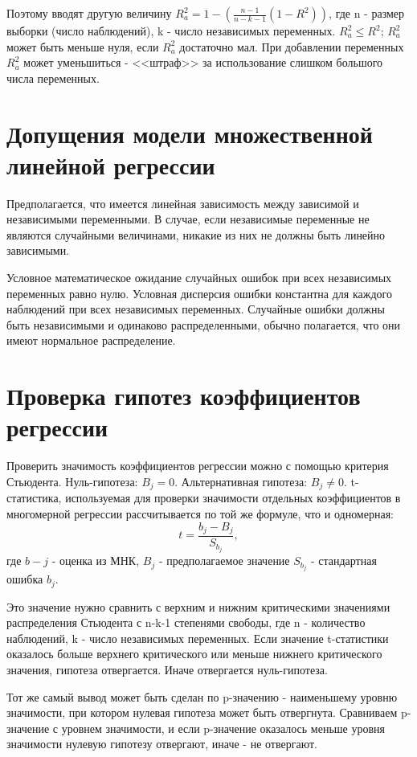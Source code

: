 Поэтому вводят другую величину $R_a^2 = 1 - (\frac{n-1}{n-k-1}(1-R^2))$, где n - размер выборки (число наблюдений), k - число независимых переменных. $R_a^2 \leq R^2$; $R_a^2$ может быть меньше нуля, если $R_a^2$ достаточно мал. При добавлении переменных $R_a^2$ может уменьшиться - <<штраф>> за использование слишком большого числа переменных.
\section{Допущения модели множественной линейной регрессии}
\hspace*{\parindent}
Предполагается, что имеется линейная зависимость между зависимой и независимыми переменными. В случае, если независимые переменные не являются случайными величинами, никакие из них не должны быть линейно зависимыми. 

Условное математическое ожидание случайных ошибок при всех независимых переменных равно нулю. Условная дисперсия ошибки константна для каждого наблюдений при всех независимых переменных. Случайные ошибки должны быть независимыми и одинаково распределенными, обычно полагается, что они имеют нормальное распределение.
\section{Проверка гипотез коэффициентов регрессии}
\hspace*{\parindent}
Проверить значимость коэффициентов регрессии можно с помощью критерия Стьюдента. Нуль-гипотеза: $B_j=0$. Альтернативная гипотеза: $B_j\neq0$. t-статистика, используемая для проверки значимости отдельных коэффициентов в многомерной регрессии рассчитывается по той же формуле, что и одномерная: $$t = \frac{b_j - B_j}{S_{b_{j}}},$$ где $b-j$ - оценка из МНК, $B_j$ - предполагаемое значение $S_{b_{j}}$ - стандартная ошибка $b_j$.

Это значение нужно сравнить с верхним и нижним критическими значениями распределения Стьюдента с n-k-1 степенями свободы, где n - количество наблюдений, k - число независимых переменных. Если значение t-статистики оказалось больше верхнего критического или меньше нижнего критического значения, гипотеза отвергается. Иначе отвергается нуль-гипотеза.

Тот же самый вывод может быть сделан по p-значению - наименьшему уровню значимости, при котором нулевая гипотеза может быть отвергнута. Сравниваем p-значение с уровнем значимости, и если p-значение оказалось меньше уровня значимости нулевую гипотезу отвергают, иначе - не отвергают.

